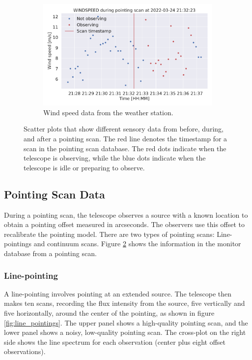 \begin{figure}[H]
\begin{subfigure}[t]{0.49\textwidth}
        \centering
        \includegraphics[width=\textwidth]{Feature during scans/scan_WINDSPEED_335.pdf}
        \caption{Wind speed data from the weather station.}
        \label{subfig:scan_windspeed}
    \end{subfigure}
     \caption[Features during pointing scans]{Scatter plots that show different sensory data from before, during, and after a pointing scan. The red line denotes the timestamp for a scan in the pointing scan database.
     The red dots indicate when the telescope is observing, while the blue dots indicate when the telescope is idle or preparing to observe.}
     \label{fig:features_during_scans}
\end{figure}


\subsection{Pointing Scan Data}
During a pointing scan, the telescope observes a source with a known location to obtain a pointing offset measured in arcseconds.
The observers use this offset to recalibrate the pointing model. There are two types of pointing scans: Line-pointings and continuum scans.
Figure \ref{fig:features_during_scans} shows the information in the monitor database from a pointing scan.

\subsubsection{Line-pointing}
A line-pointing involves pointing at an extended source. 
The telescope then makes ten scans, recording the flux intensity from the source, five vertically and five horizontally,
around the center of the pointing, as shown in figure \ref{fig:line_pointings}.
The upper panel shows a high-quality pointing scan, and the lower panel shows a noisy, low-quality pointing scan.
The cross-plot on the right side shows the line spectrum for each observation (center plus eight offset observations).

